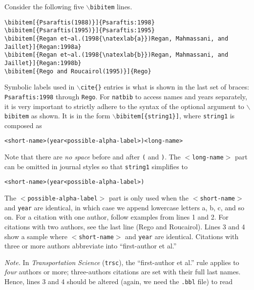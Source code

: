 \documentclass[ijds,nonblindrev]{informs4}
\begin{document}
Consider the following five \texttt{$\backslash $bibitem} lines.

\smallskip

\begin{Verbatim}[fontsize=\scriptsize]
\bibitem[{Psaraftis(1988)}]{Psaraftis:1998}
\bibitem[{Psaraftis(1995)}]{Psaraftis:1995}
\bibitem[{Regan et~al.(1998{\natexlab{a}})Regan, Mahmassani, and Jaillet}]{Regan:1998a}
\bibitem[{Regan et~al.(1998{\natexlab{b}})Regan, Mahmassani, and Jaillet}]{Regan:1998b}
\bibitem[{Rego and Roucairol(1995)}]{Rego}
\end{Verbatim}

\smallskip

\noindent 
Symbolic labels used in \texttt{$\backslash $cite\{\}} entries is 
what is shown in the last set of braces: \texttt{Psaraftis:1998} through 
\texttt{Rego}. For \texttt{natbib} to access names and years 
separately, it is very important to strictly adhere to the syntax of the 
optional argument to \texttt{$\backslash $bibitem} as shown. It is in the 
form \texttt{$\backslash $bibitem[\{string1\}]}, where \texttt{string1} is composed as

\begin{Verbatim}[fontsize=\small]
     <short-name>(year<possible-alpha-label>)<long-name>
\end{Verbatim}

\noindent 
Note that there are {\it no space} before and after \texttt{(} and \texttt{)}. The 
\texttt{$<$long-name$>$} part can be omitted in journal styles so that \texttt{string1} simplifies to

\begin{Verbatim}[fontsize=\small]
     <short-name>(year<possible-alpha-label>)
\end{Verbatim}

\noindent 
The \texttt{$<$possible-alpha-label$>$} part is only used when the
\texttt{$<$short-name$>$} and \texttt{year} are identical, in which case we append  
lowercase letters a, b, c, and so on. For a citation with one author, follow 
examples from lines 1 and 2. For citations with two authors, see the last 
line (Rego and Roucairol). Lines 3 and 4 show a sample where
\texttt{$<$short-name$>$} and \texttt{year} are identical. Citations with three or  
more authors abbreviate into ``first-author et al.''

{\it Note.} In {\it Transportation Science} (\texttt{trsc}), the ``first-author et al.'' rule applies to {\it four} 
authors or more; three-authors citations are set with their full last names. 
Hence, lines 3 and 4 should be altered (again, we need the
\texttt{.bbl} file) to read
\end{document}
